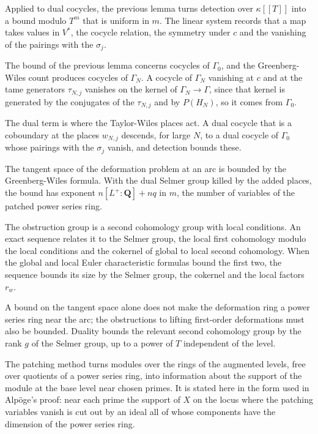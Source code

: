 Applied to dual cocycles, the previous lemma turns detection over $\kappa[[T]]$ into a bound modulo $T^m$ that is uniform in $m$. The linear system records that a map takes values in $V^*$, the cocycle relation, the symmetry under $c$ and the vanishing of the pairings with the $\sigma_j$.

The bound of the previous lemma concerns cocycles of $\Gamma_0$, and the Greenberg-Wiles count produces cocycles of $\Gamma_N$. A cocycle of $\Gamma_N$ vanishing at $c$ and at the tame generators $\tau_{N,j}$ vanishes on the kernel of $\Gamma_N\to\Gamma$, since that kernel is generated by the conjugates of the $\tau_{N,j}$ and by $P(H_N)$, so it comes from $\Gamma_0$.

The dual term is where the Taylor-Wiles places act. A dual cocycle that is a coboundary at the places $w_{N,j}$ descends, for large $N$, to a dual cocycle of $\Gamma_0$ whose pairings with the $\sigma_j$ vanish, and detection bounds these.

The tangent space of the deformation problem at an arc is bounded by the Greenberg-Wiles formula. With the dual Selmer group killed by the added places, the bound has exponent $n[L^+:\mathbf Q]+nq$ in $m$, the number of variables of the patched power series ring.

The obstruction group is a second cohomology group with local conditions. An exact sequence relates it to the Selmer group, the local first cohomology modulo the local conditions and the cokernel of global to local second cohomology. When the global and local Euler characteristic formulas bound the first two, the sequence bounds its size by the Selmer group, the cokernel and the local factors $r_w$.

A bound on the tangent space alone does not make the deformation ring a power series ring near the arc; the obstructions to lifting first-order deformations must also be bounded. Duality bounds the relevant second cohomology group by the rank $g$ of the Selmer group, up to a power of $T$ independent of the level.

The patching method turns modules over the rings of the augmented levels, free over quotients of a power series ring, into information about the support of the module at the base level near chosen primes. It is stated here in the form used in Alpöge's proof: near each prime the support of $X$ on the locus where the patching variables vanish is cut out by an ideal all of whose components have the dimension of the power series ring.

